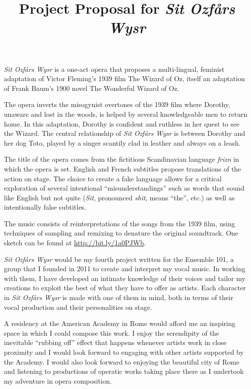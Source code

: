\documentclass{article}
\title{Project Proposal for \emph{Sit Ozfårs Wysr}}
\author{}
\date{}
\begin{document}
\thispagestyle{empty}
\maketitle
\thispagestyle{empty}
\emph{Sit Ozfårs Wysr} is a one-act opera that proposes a multi-lingual, feminist
adaptation of Victor Fleming's 1939 film The Wizard of Oz, itself an
adaptation of Frank Baum's 1900 novel The Wonderful Wizard of Oz.\par

The opera inverts the misogynist overtones of the 1939 film where Dorothy,
unaware and lost in the woods, is helped by several knowledgeable men to return home.  In
this adaptation, Dorothy is confident and ruthless in her quest to see the
Wizard.  The central relationship of \emph{Sit Ozfårs Wysr} is between Dorothy and
her dog Toto, played by a singer scantily clad in leather and always on a
leash.\par

The title of the opera comes from the fictitious Scandinavian language
\emph{frizn} in which the opera is set.  English and French subtitles propose
translations of the action on stage. The choice to create a
fake language allows for a critical exploration of several intentional
``misunderstandings'' such as words that sound like English but not quite
(\emph{Sit}, pronounced \emph{shit}, means ``the'', etc.) as well as
intentionally false subtitles.\par

The music consists of reinterpretations of the songs from the 1939 film,
using techniques of sampling and remixing to denature the original
soundtrack.
One sketch can be found at \url{http://bit.ly/1a0PJWb}.\par

\emph{Sit Ozfårs Wysr} would be my fourth project written for the Ensemble 101,
a group that I founded in 2011 to create and interpret my vocal music.  In
working with them, I have developed an intimate knowledge of their voices
and tailor my creations to exploit the best of what they have to
offer as artists. Each character in \emph{Sit Ozfårs Wysr} is made with one
of them in mind, both in terms of their vocal production and their
personalities
on stage.\par

A residency at the American Academy in Rome would afford me an inspiring space in which
I could compose this work.  I enjoy the serendipity of the inevitable ``rubbing off'' effect that
happens whenever artists work in close proximity and I would look forward to
engaging with other artists supported by the Academy. I would also look forward to
enjoying the beautiful city of Rome and listening to productions of operatic works
taking place there as I undertook my adventure in opera composition.\par
\end{document}
